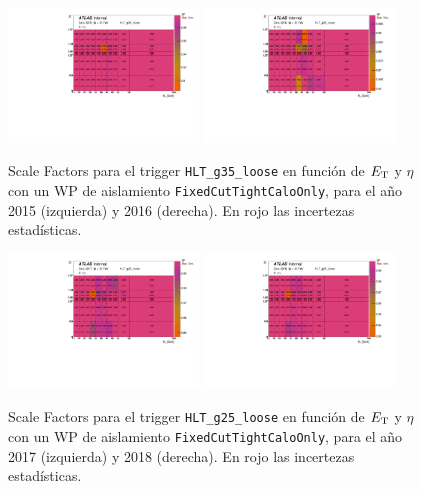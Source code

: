 
\begin{figure}[!ht]
  \centering
      {\includegraphics[width=0.45\textwidth]{images/trigger/2015_h_sf_et_eta_tr_HLT_g35_loose_FixedCutTightCaloOnly.pdf}}
      {\includegraphics[width=0.45\textwidth]{images/trigger/2016_h_sf_et_eta_tr_HLT_g35_loose_FixedCutTightCaloOnly.pdf}}
      \caption{Scale Factors para el trigger \texttt{HLT\_g35\_loose} en función de $E_{\text{T}}$ y $\eta$ con un WP de aislamiento \texttt{FixedCutTightCaloOnly}, para el año 2015 (izquierda) y 2016 (derecha). En rojo las incertezas estadísticas.}
      \label{fig:SFs_2015_2016}
\end{figure}
\begin{figure}[!ht]
  \centering
      {\includegraphics[width=0.45\textwidth]{images/trigger/2017_h_sf_et_eta_tr_HLT_g25_loose_FixedCutTightCaloOnly.pdf}}
      {\includegraphics[width=0.45\textwidth]{images/trigger/2018_h_sf_et_eta_tr_HLT_g25_loose_FixedCutTightCaloOnly.pdf}}
      \caption{Scale Factors para el trigger \texttt{HLT\_g25\_loose} en función de $E_{\text{T}}$ y $\eta$ con un WP de aislamiento \texttt{FixedCutTightCaloOnly}, para el año 2017 (izquierda) y 2018 (derecha). En rojo las incertezas estadísticas.}
      \label{fig:SFs_2017_2018}
\end{figure}

